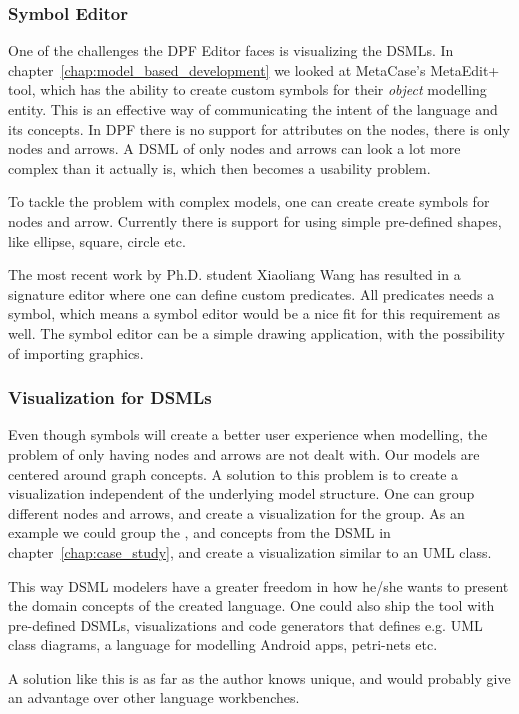 \subsubsection{Symbol Editor}
One of the challenges the DPF Editor faces is visualizing the DSMLs. In chapter~\ref{chap:model_based_development} we looked at MetaCase's MetaEdit+ tool, which has the ability to create custom symbols for their \emph{object} modelling entity. This is an effective way of communicating the intent of the language and its concepts. In DPF there is no support for attributes on the nodes, there is only nodes and arrows. A DSML of only nodes and arrows can look a lot more complex than it actually is, which then becomes a usability problem.

To tackle the problem with complex models, one can create create symbols for nodes and arrow. Currently there is support for using simple pre-defined shapes, like ellipse, square, circle etc.

The most recent work by Ph.D. student Xiaoliang Wang has resulted in a signature editor where one can define custom predicates. All predicates needs a symbol, which means a symbol editor would be a nice fit for this requirement as well. The symbol editor can be a simple drawing application, with the possibility of importing graphics.

\subsubsection{Visualization for DSMLs}
Even though symbols will create a better user experience when modelling, the problem of only having nodes and arrows are not dealt with. Our models are centered around graph concepts. A solution to this problem is to create a visualization independent of the underlying model structure. One can group different nodes and arrows, and create a visualization for the group. As an example we could group the ,  and  concepts from the DSML in chapter~\ref{chap:case_study}, and create a visualization similar to an UML class.

This way DSML modelers have a greater freedom in how he/she wants to present the domain concepts of the created language. One could also ship the tool with pre-defined DSMLs, visualizations and code generators that defines e.g. UML class diagrams, a language for modelling Android apps, petri-nets etc.

A solution like this is as far as the author knows unique, and would probably give an advantage over other language workbenches.

